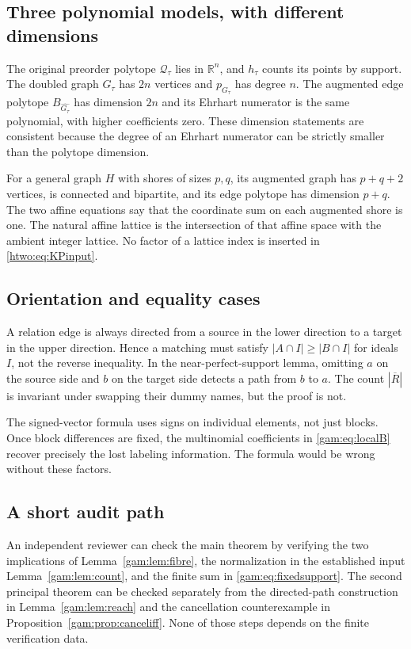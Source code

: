 \documentclass[11pt]{article}
\numberwithin{equation}{section}
\theoremstyle{definition}
\newcommand{\R}{\mathbb R}
\newcommand{\Qt}{\mathcal Q_\tau}
\begin{document}
\subsection{Three polynomial models, with different dimensions}
The original preorder polytope $\Qt$ lies in $\R^n$, and $h_\tau$ counts
its points by support. The doubled graph $G_\tau$ has $2n$ vertices and
$p_{G_\tau}$ has degree $n$. The augmented edge polytope
$B_{\widehat{G_\tau}}$ has dimension $2n$ and its Ehrhart numerator is the
same polynomial, with higher coefficients zero. These dimension statements
are consistent because the degree of an Ehrhart numerator can be strictly
smaller than the polytope dimension.

For a general graph $H$ with shores of sizes $p,q$, its augmented graph has
$p+q+2$ vertices, is connected and bipartite, and its edge polytope has
dimension $p+q$. The two affine equations say that the coordinate sum on
each augmented shore is one. The natural affine lattice is the intersection
of that affine space with the ambient integer lattice. No factor of a
lattice index is inserted in \eqref{htwo:eq:KPinput}.

\subsection{Orientation and equality cases}
A relation edge is always directed from a source in the lower direction to
a target in the upper direction. Hence a matching must satisfy
$|A\cap I|\ge|B\cap I|$ for ideals $I$, not the reverse inequality. In the
near-perfect-support lemma, omitting $a$ on the source side and $b$ on the
target side detects a path from $b$ to $a$. The count $|\overline R|$ is
invariant under swapping their dummy names, but the proof is not.

The signed-vector formula uses signs on individual elements, not just
blocks. Once block differences are fixed, the multinomial coefficients in
\eqref{gam:eq:localB} recover precisely the lost labeling information. The
formula would be wrong without these factors.

\subsection{A short audit path}
An independent reviewer can check the main theorem by verifying the two
implications of Lemma~\ref{gam:lem:fibre}, the normalization in the established
input Lemma~\ref{gam:lem:count}, and the finite sum in
\eqref{gam:eq:fixedsupport}. The second principal theorem can be checked
separately from the directed-path construction in Lemma~\ref{gam:lem:reach} and
the cancellation counterexample in Proposition~\ref{gam:prop:canceliff}.
None of those steps depends on the finite verification data.
\end{document}
